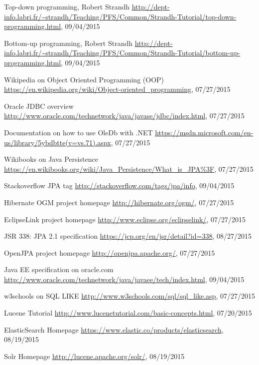 \begin{thebibliography}{100}
	 Top-down programming, Robert Strandh
	\url{http://dept-info.labri.fr/~strandh/Teaching/PFS/Common/Strandh-Tutorial/top-down-programming.html},
	09/04/2015

	 Bottom-up programming, Robert Strandh
	\url{http://dept-info.labri.fr/~strandh/Teaching/PFS/Common/Strandh-Tutorial/bottom-up-programming.html},
	09/04/2015

	 Wikipedia on Object Oriented Programming (OOP)
	\url{https://en.wikipedia.org/wiki/Object-oriented_programming}, 07/27/2015

	 Oracle JDBC overview
	\url{http://www.oracle.com/technetwork/java/javase/jdbc/index.html}, 07/27/2015

	 Documentation on how to use OleDb with .NET
	\url{https://msdn.microsoft.com/en-us/library/5ybdbtte(v=vs.71).aspx}, 07/27/2015

	 Wikibooks on Java Persistence
	\url{https://en.wikibooks.org/wiki/Java_Persistence/What_is_JPA\%3F}, 07/27/2015

	 Stackoverflow JPA tag
	\url{http://stackoverflow.com/tags/jpa/info}, 09/04/2015

	 Hibernate OGM project homepage
	\url{http://hibernate.org/ogm/}, 07/27/2015

	 EclipseLink project homepage
	\url{http://www.eclipse.org/eclipselink/}, 07/27/2015

	 JSR 338: JPA 2.1 specification
	\url{https://jcp.org/en/jsr/detail?id=338}, 08/27/2015

	 OpenJPA project homepage
	\url{http://openjpa.apache.org/}, 07/27/2015

	 Java EE specification on oracle.com
	\url{http://www.oracle.com/technetwork/java/javaee/tech/index.html}, 09/04/2015

	 w3schools on SQL LIKE
	\url{http://www.w3schools.com/sql/sql_like.asp}, 07/27/2015

	 Lucene Tutorial
	\url{http://www.lucenetutorial.com/basic-concepts.html}, 07/20/2015

	 ElasticSearch Homepage
	\url{https://www.elastic.co/products/elasticsearch}, 08/19/2015

	 Solr Homepage
	\url{http://lucene.apache.org/solr/}, 08/19/2015


\end{thebibliography}
